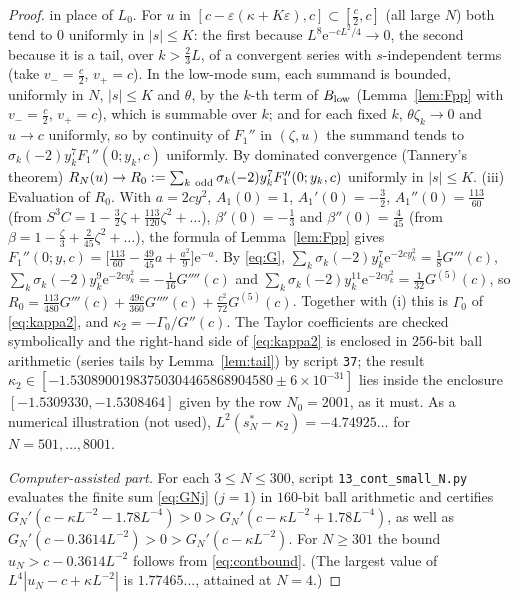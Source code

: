 \documentclass[11pt,a4paper]{article}
\theoremstyle{definition}
\theoremstyle{remark}
\newcommand{\ee}{\mathrm{e}}
\begin{document}
\begin{proof}
in place of $L_0$. For $u$ in $[c-\varepsilon(\kappa+K\varepsilon),c]\subset[\frac c2,c]$ (all large $N$) both tend to
$0$ uniformly in $|s|\le K$: the first because $L^8\ee^{-cL^2/4}\to0$, the second because it is a tail, over $k>\frac23L$,
of a convergent series with $s$-independent terms (take $v_-=\frac c2$, $v_+=c$). In the low-mode sum, each summand is
bounded, uniformly in $N$, $|s|\le K$ and $\theta$, by the $k$-th term of $B_{\rm low}$ (Lemma~\ref{lem:Fpp} with
$v_-=\frac c2$, $v_+=c$), which is summable over $k$; and for each fixed $k$, $\theta\zeta_k\to0$ and $u\to c$ uniformly,
so by continuity of $F_1''$ in $(\zeta,u)$ the summand tends to $\sigma_k(-2)y_k^7F_1''(0;y_k,c)$ uniformly. By
dominated convergence (Tannery's theorem) $R_N(u)\to R_0:=\sum_{k\ \rm odd}\sigma_k(-2)y_k^7F_1''(0;y_k,c)$ uniformly in
$|s|\le K$.
(iii) Evaluation of $R_0$. With $a=2cy^2$, $A_1(0)=1$, $A_1'(0)=-\frac32$, $A_1''(0)=\frac{113}{60}$ (from
$S^3C=1-\frac32\zeta+\frac{113}{120}\zeta^2+\dots$), $\beta'(0)=-\frac13$ and $\beta''(0)=\frac4{45}$ (from
$\beta=1-\frac\zeta3+\frac2{45}\zeta^2+\dots$), the formula of Lemma~\ref{lem:Fpp} gives
$F_1''(0;y,c)=\bigl[\frac{113}{60}-\frac{49}{45}a+\frac{a^2}9\bigr]\ee^{-a}$. By \eqref{eq:G},
$\sum_k\sigma_k(-2)y_k^{7}\ee^{-2cy_k^2}=\frac18G'''(c)$, $\sum_k\sigma_k(-2)y_k^{9}\ee^{-2cy_k^2}=-\frac1{16}G''''(c)$ and
$\sum_k\sigma_k(-2)y_k^{11}\ee^{-2cy_k^2}=\frac1{32}G^{(5)}(c)$, so
$R_0=\frac{113}{480}G'''(c)+\frac{49c}{360}G''''(c)+\frac{c^2}{72}G^{(5)}(c)$. Together with (i) this is $\Gamma_0$ of
\eqref{eq:kappa2}, and $\kappa_2=-\Gamma_0/G''(c)$.
The Taylor coefficients are checked symbolically and the right-hand side of \eqref{eq:kappa2} is enclosed in $256$-bit ball
arithmetic (series tails by Lemma~\ref{lem:tail}) by script \texttt{37}; the result
$\kappa_2\in[-1.53089001983750304465868904580\pm6\times10^{-31}]$ lies inside the enclosure $[-1.5309330,-1.5308464]$ given by
the row $N_0=2001$, as it must. As a numerical illustration (not used), $L^2(s^*_N-\kappa_2)=-4.74925\ldots$ for
$N=501,\dots,8001$. %

\emph{Computer-assisted part.} For each $3\le N\le300$, script \texttt{13\_cont\_small\_N.py} evaluates the finite
sum \eqref{eq:GNj} ($j=1$) in $160$-bit ball arithmetic and certifies
$G_N'(c-\kappa L^{-2}-1.78L^{-4})>0>G_N'(c-\kappa L^{-2}+1.78L^{-4})$, as well as
$G_N'(c-0.3614L^{-2})>0>G_N'(c-\kappa L^{-2})$. For $N\ge301$ the bound $u_N>c-0.3614L^{-2}$ follows from
\eqref{eq:contbound}. (The largest value of $L^4|u_N-c+\kappa L^{-2}|$ is $1.77465\ldots$, attained at $N=4$.)
\end{proof}
\end{document}
